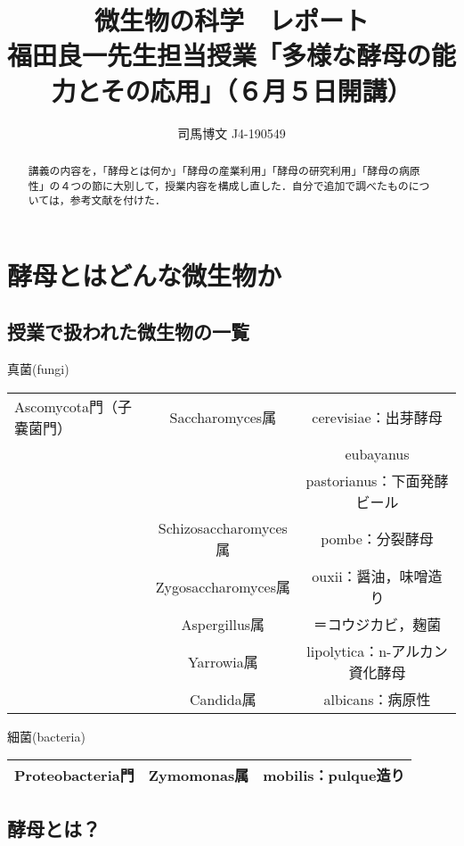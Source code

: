 \documentclass[uplatex, dvipdfmx]{jsarticle}
\title{微生物の科学　レポート\\福田良一先生担当授業「多様な酵母の能力とその応用」（６月５日開講）}
\author{司馬博文 J4-190549}
\begin{document}
\maketitle
\begin{abstract}
    講義の内容を，「酵母とは何か」「酵母の産業利用」「酵母の研究利用」「酵母の病原性」の４つの節に大別して，授業内容を構成し直した．自分で追加で調べたものについては，参考文献を付けた．
\end{abstract}

\section{酵母とはどんな微生物か}

\subsection{授業で扱われた微生物の一覧}

真菌(fungi)
\begin{center}
\begin{table}[h]\centering
    \begin{tabular}{|l|c|c|}\hline
        Ascomycota門（子嚢菌門）& Saccharomyces属 &cerevisiae：出芽酵母 \\
        && eubayanus\\
        && pastorianus：下面発酵ビール\\\hline
        &Schizosaccharomyces属&pombe：分裂酵母\\\hline
        &Zygosaccharomyces属&ouxii：醤油，味噌造り\\\hline
        &Aspergillus属&＝コウジカビ，麹菌\\\hline
        &Yarrowia属&lipolytica：n-アルカン資化酵母\\\hline
        &Candida属&albicans：病原性\\\hline
    \end{tabular}
\end{table}
\end{center}

細菌(bacteria)
\begin{table}[h]\centering
    \begin{tabular}{|l|c|c|}\hline
        Proteobacteria門&Zymomonas属 &mobilis：pulque造り\\\hline
    \end{tabular}
\end{table}

\subsection{酵母とは？}
\end{document}

